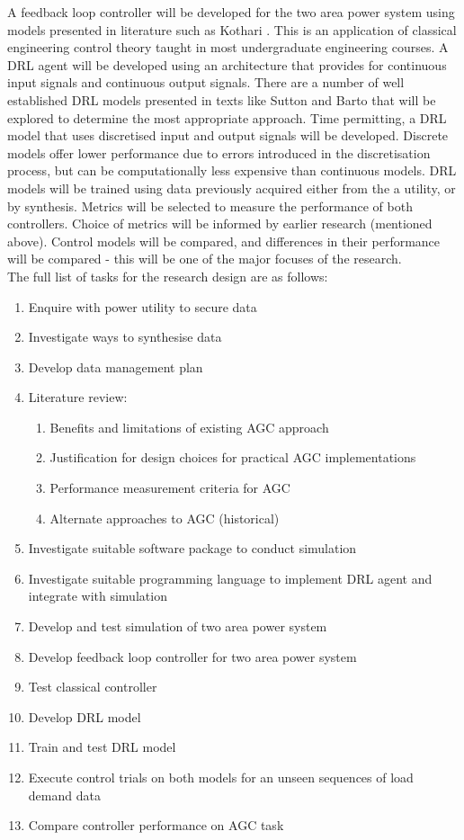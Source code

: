 \documentclass[12pt, a4paper]{article}
\begin{document}
A feedback loop controller will be developed for the two area power system using models presented in literature such as Kothari \cite{Kothari2011}. This is an application of classical engineering control theory taught in most undergraduate engineering courses. A DRL agent will be developed using an architecture that provides for continuous input signals and continuous output signals. There are a number of well established DRL models presented in texts like Sutton and Barto that will be explored to determine the most appropriate approach. Time permitting, a DRL model that uses discretised input and output signals will be developed. Discrete models offer lower performance due to errors introduced in the discretisation process, but can be computationally less expensive than continuous models. DRL models will be trained using data previously acquired either from the a utility, or by synthesis. Metrics will be selected to measure the performance of both controllers. Choice of metrics will be informed by earlier research (mentioned above). Control models will be compared, and differences in their performance will be compared - this will be one of the major focuses of the research.\\

The full list of tasks for the research design are as follows:
\begin{enumerate}
	\item Enquire with power utility to secure data
	\item Investigate ways to synthesise data
	\item Develop data management plan
	\item Literature review:
	\begin{enumerate}
		\item Benefits and limitations of existing AGC approach
		\item Justification for design choices for practical AGC implementations
		\item Performance measurement criteria for AGC
		\item Alternate approaches to AGC (historical)
	\end{enumerate}
	\item Investigate suitable software package to conduct simulation
	\item Investigate suitable programming language to implement DRL agent and integrate with simulation
	\item Develop and test simulation of two area power system
	\item Develop feedback loop controller for two area power system
	\item Test classical controller
	\item Develop DRL model
	\item Train and test DRL model
	\item Execute control trials on both models for an unseen sequences of load demand data
	\item Compare controller performance on AGC task
\end{enumerate}
\end{document}
